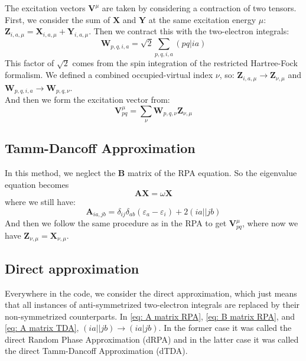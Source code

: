 \documentclass[12pt]{caltech_thesis}
\begin{document}
The excitation vectors $\textbf{V}^{\mu}$ are taken by considering a contraction of two tensors. First, we consider the sum of $\textbf{X}$ and $\textbf{Y}$ at the same excitation energy $\mu$: $\textbf{Z}_{i,a,\mu} = \textbf{X}_{i,a,\mu} + \textbf{Y}_{i,a,\mu}$. Then we contract this with the two-electron integrals:
\begin{equation}
    \textbf{W}_{p,q,i,a} = \sqrt{2} \sum_{p,q,i,a} (pq|ia)
\end{equation}
This factor of $\sqrt{2}$ comes from the spin integration of the restricted Hartree-Fock formalism.
We defined a combined occupied-virtual index $\nu$, so: $\textbf{Z}_{i,a,\mu} \rightarrow \textbf{Z}_{\nu, \mu}$ and $\textbf{W}_{p,q,i,a}\rightarrow \textbf{W}_{p,q,\nu}$.\\

And then we form the excitation vector from:
\begin{equation}
    \textbf{V}_{pq}^{\mu} = \sum_{\nu} \textbf{W}_{p,q,\nu}\textbf{Z}_{\nu, \mu}
\end{equation}

\subsection{Tamm-Dancoff Approximation}
In this method, we neglect the $\textbf{B}$ matrix of the RPA equation. So the eigenvalue equation becomes
\begin{equation}
    \textbf{A}\textbf{X} = \omega \textbf{X}
\end{equation}
where we still have:
\begin{equation}
    \textbf{A}_{ia,jb} = \delta _{ij}\delta _{ab}(\varepsilon _{a}- \varepsilon _{i}) + 2(ia||jb)
\label{eq: A matrix TDA}
\end{equation}
And then we follow the same procedure as in the RPA to get $\textbf{V}_{pq}^{\mu}$, where now we have $\textbf{Z}_{\nu, \mu} = \textbf{X}_{\nu, \mu}$.
\subsection{Direct approximation}
Everywhere in the code, we consider the direct approximation, which just means that all instances of anti-symmetrized two-electron integrals are replaced by their non-symmetrized counterparts. In \ref{eq: A matrix RPA}, \ref{eq: B matrix RPA}, and \ref{eq: A matrix TDA}, $(ia||jb) \rightarrow (ia|jb)$. In the former case it was called the direct Random Phase Approximation (dRPA) and in the latter case it was called the direct Tamm-Dancoff Approximation (dTDA).
\end{document}
